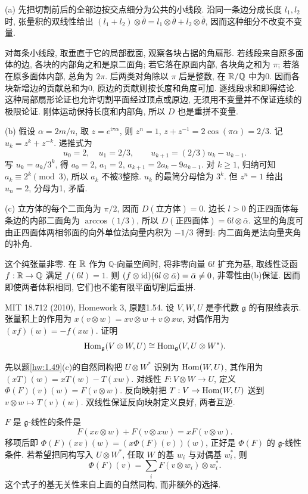 \begin{solution}
(a) 先把切割前后的全部边按交点细分为公共的小线段. 沿同一条边分成长度 $l_1,l_2$ 时, 张量积的双线性给出 $(l_1+l_2)\otimes\bar\theta=l_1\otimes\bar\theta+l_2\otimes\bar\theta$, 因而这种细分不改变不变量.

对每条小线段, 取垂直于它的局部截面, 观察各块占据的角扇形. 若线段来自原多面体的边, 各块的内部角之和是原二面角; 若它落在原面内部, 各块角之和为 $\pi$; 若落在原多面体内部, 总角为 $2\pi$. 后两类对角除以 $\pi$ 后是整数, 在 $\mathbb R/\mathbb Q$ 中为0. 因而各块新增边的贡献总和为0, 原边的贡献则按长度和角度可加. 逐线段求和即得结论. 这种局部扇形论证也允许切割平面经过顶点或原边, 无须用不变量并不保证连续的极限论证. 刚体运动保持长度和内部角, 所以 $D$ 也是重拼不变量.

(b) 假设 $\alpha=2m/n$, 取 $z=e^{\mathrm i\pi\alpha}$, 则 $z^n=1$, $z+z^{-1}=2\cos(\pi\alpha)=2/3$. 记 $u_k=z^k+z^{-k}$. 递推式为
\[
u_0=2,\quad u_1=2/3,\qquad u_{k+1}=(2/3)u_k-u_{k-1}.
\]
写 $u_k=a_k/3^k$, 得 $a_0=2$, $a_1=2$, $a_{k+1}=2a_k-9a_{k-1}$. 对 $k\ge1$, 归纳可知 $a_k\equiv2^k\pmod3$, 所以 $a_k$ 不被3整除. $u_k$ 的最简分母恰为 $3^k$. 但 $z^n=1$ 给出 $u_n=2$, 分母为1, 矛盾.

(c) 立方体的每个二面角为 $\pi/2$, 因而 $D(\text{立方体})=0$. 边长 $l>0$ 的正四面体每条边的内部二面角为 $\arccos(1/3)$, 所以 $D(\text{正四面体})=6l\otimes\bar\alpha$. 这里的角度可由正四面体两相邻面的向外单位法向量内积为 $-1/3$ 得到: 内二面角是法向量夹角的补角.

这个纯张量非零. 在 $\mathbb R$ 作为 $\mathbb Q$-向量空间时, 将非零向量 $6l$ 扩充为基, 取线性泛函 $f:\mathbb R\to\mathbb Q$ 满足 $f(6l)=1$. 则 $(f\otimes\operatorname{id})(6l\otimes\bar\alpha)=\bar\alpha\ne0$, 非零性由(b)保证. 因而即使两者体积相同, 它们也不能有限平面切割后重拼.
\end{solution}

\begin{exercise}\label{hw:1.54}
MIT 18.712 (2010), Homework 3, 原题1.54. 设 $V,W,U$ 是李代数 $\mathfrak g$ 的有限维表示. 张量积上的作用为 $x(v\otimes w)=xv\otimes w+v\otimes xw$, 对偶作用为 $(xf)(w)=-f(xw)$. 证明
\[
\operatorname{Hom}_{\mathfrak g}(V\otimes W,U)\cong
\operatorname{Hom}_{\mathfrak g}(V,U\otimes W^*).
\]
\end{exercise}
\begin{solution}
先以题\ref{hw:1.49}(c)的自然同构把 $U\otimes W^*$ 识别为 $\operatorname{Hom}(W,U)$, 其作用为 $(xT)(w)=xT(w)-T(xw)$. 对线性 $F:V\otimes W\to U$, 定义 $\Phi(F)(v)(w)=F(v\otimes w)$. 反向映射把 $T:V\to\operatorname{Hom}(W,U)$ 送到 $v\otimes w\mapsto T(v)(w)$. 双线性保证反向映射定义良好, 两者互逆.

$F$ 是 $\mathfrak g$-线性的条件是
\[
F(xv\otimes w)+F(v\otimes xw)=xF(v\otimes w).
\]
移项后即 $\Phi(F)(xv)(w)=(x\Phi(F)(v))(w)$, 正好是 $\Phi(F)$ 的 $\mathfrak g$-线性条件. 若希望把同构写入 $U\otimes W^*$, 任取 $W$ 的基 $w_i$ 与对偶基 $w_i^*$, 则
\[
\Phi(F)(v)=\sum_i F(v\otimes w_i)\otimes w_i^*.
\]
这个式子的基无关性来自上面的自然同构, 而非额外的选择.
\end{solution}

